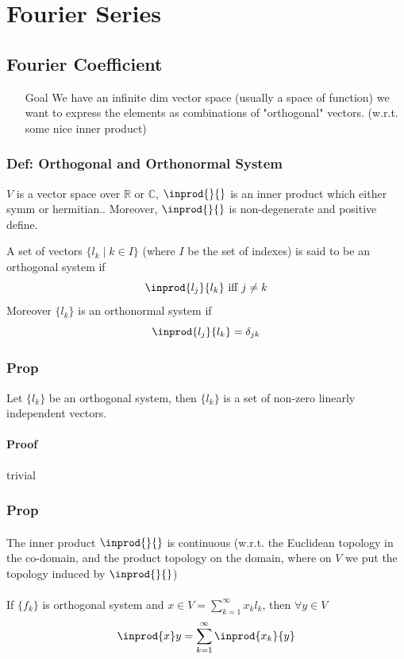 \documentclass{book}
\begin{document}
\part{Fourier Series}
\chapter{Fourier Coefficient}
\begin{itemize}
    \item[Goal]We have an infinite dim vector space (usually a space of function) we want to express the elements as combinations of "orthogonal" vectors. (w.r.t. some nice inner product)
\end{itemize}
\section{Def: Orthogonal and Orthonormal System}
$V$ is a vector space over $\mathbb{R}$ or $\mathbb{C}$, $\inprod{}{}$ is an inner product which either symm or hermitian.. Moreover, $\inprod{}{}$ is non-degenerate and positive define. 

A set of vectors $\{l_k\mid k\in I\}$ (where $I$ be the set of indexes) is said to be an orthogonal system if$$\inprod{l_j}{l_k}\text{ iff } j\neq k$$
Moreover $\{l_k\}$ is an orthonormal system if$$\inprod{l_j}{l_k}=\delta_{jk}$$
\section{Prop}
Let $\{l_k\}$ be an orthogonal system, then $\{l_k\}$ is a set of non-zero linearly independent vectors.
\subsection*{Proof}trivial
\section{Prop}
\subsection*{}The inner product $\inprod{}{}$ is continuous (w.r.t. the Euclidean topology in the co-domain, and the product topology on the domain, where on $V$ we put the topology induced by $\inprod{}{}$)
\subsection*{}If $\{f_k\}$ is orthogonal system and $x\in V=\sum\limits_{k=1}^\infty x_kl_k$, then $\forall y\in V$$$\inprod{x}y=\sum\limits_{k=1}^\infty\inprod{x_k}{y}$$
\end{document}
